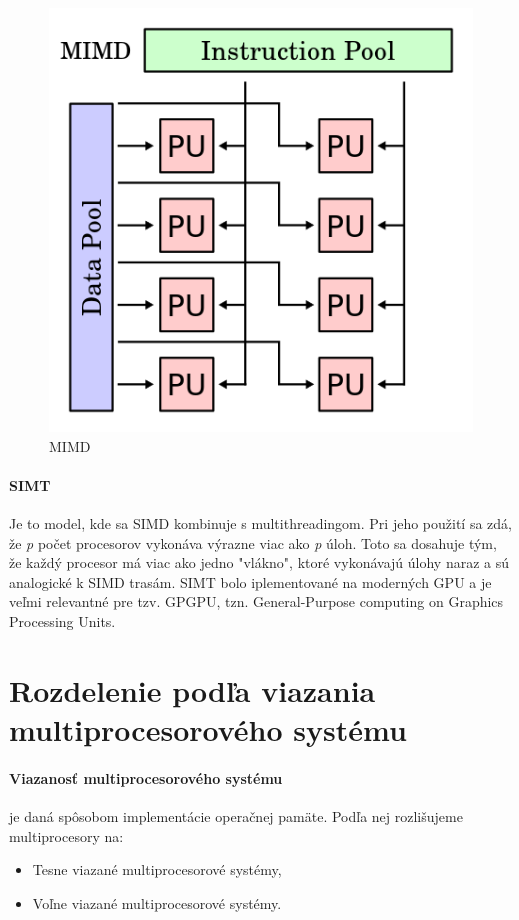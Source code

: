 \documentclass[11pt,a4paper]{report}
\begin{document}
\begin{figure}[ht]
        \centering
        \includegraphics[scale=0.25]{images/MIMD}
        \caption{MIMD}
        \label{MIMD:}
\end{figure}

\paragraph{SIMT} Je to model, kde sa SIMD kombinuje s multithreadingom. Pri jeho použití sa zdá, že \textit{p} počet procesorov vykonáva výrazne viac ako \textit{p} úloh. Toto sa dosahuje tým, že každý procesor má viac ako jedno "vlákno", ktoré vykonávajú úlohy naraz a sú analogické k SIMD trasám. SIMT bolo iplementované na moderných GPU a je veľmi relevantné pre tzv. GPGPU, tzn. General-Purpose computing on Graphics Processing Units.








\section{Rozdelenie podľa viazania multiprocesorového systému}
\paragraph{Viazanosť multiprocesorového systému} je daná spôsobom implementácie operačnej pamäte. Podľa nej rozlišujeme multiprocesory na:
\begin{itemize}
\item Tesne viazané multiprocesorové systémy,
\item Voľne viazané multiprocesorové systémy.
\end{itemize}
\end{document}
